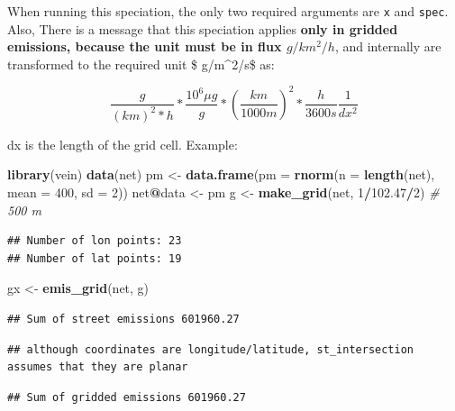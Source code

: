 \documentclass[12pt,graybox,envcountchap,sectrefs]{krantz}
\makeatletter
\newenvironment{Shaded}{\begin{snugshade}}{\end{snugshade}}
\newcommand{\KeywordTok}[1]{\textcolor[rgb]{0.13,0.29,0.53}{\textbf{#1}}}
\newcommand{\DataTypeTok}[1]{\textcolor[rgb]{0.13,0.29,0.53}{#1}}
\newcommand{\DecValTok}[1]{\textcolor[rgb]{0.00,0.00,0.81}{#1}}
\newcommand{\FloatTok}[1]{\textcolor[rgb]{0.00,0.00,0.81}{#1}}
\newcommand{\StringTok}[1]{\textcolor[rgb]{0.31,0.60,0.02}{#1}}
\newcommand{\CommentTok}[1]{\textcolor[rgb]{0.56,0.35,0.01}{\textit{#1}}}
\newcommand{\OperatorTok}[1]{\textcolor[rgb]{0.81,0.36,0.00}{\textbf{#1}}}
\newcommand{\NormalTok}[1]{#1}
\newenvironment{kframe}{%
\medskip{}
\setlength{\fboxsep}{.8em}
 \def\at@end@of@kframe{}%
 \ifinner\ifhmode%
  \def\at@end@of@kframe{\end{minipage}}%
  \begin{minipage}{\columnwidth}%
 \fi\fi%
 \def\FrameCommand##1{\hskip\@totalleftmargin \hskip-\fboxsep
 \colorbox{shadecolor}{##1}\hskip-\fboxsep
     \hskip-\linewidth \hskip-\@totalleftmargin \hskip\columnwidth}%
 \MakeFramed {\advance\hsize-\width
   \@totalleftmargin\z@ \linewidth\hsize
   \@setminipage}}%
 {\par\unskip\endMakeFramed%
 \at@end@of@kframe}
\renewenvironment{Shaded}{\begin{kframe}}{\end{kframe}}
\theoremstyle{definition}
\theoremstyle{definition}
\theoremstyle{definition}
\theoremstyle{remark}
\makeatother
\begin{document}
When running this speciation, the only two required arguments are
\texttt{x} and \texttt{spec}. Also, There is a message that this
speciation applies \textbf{only in gridded emissions, because the unit
must be in flux \(g/km^2/h\)}, and internally are transformed to the
required unit \$ \mu g/m\^{}2/s\$ as:

\[ \frac{g}{(km)^2*h}*\frac{10^6 \mu g}{g}*(\frac{km}{1000m})^2*\frac{h}{3600s}\frac{1}{dx^2}\]

dx is the length of the grid cell. Example:

\begin{Shaded}
\begin{Highlighting}[]
\KeywordTok{library}\NormalTok{(vein)}
\KeywordTok{data}\NormalTok{(net)}
\NormalTok{pm <-}\StringTok{ }\KeywordTok{data.frame}\NormalTok{(}\DataTypeTok{pm =} \KeywordTok{rnorm}\NormalTok{(}\DataTypeTok{n =} \KeywordTok{length}\NormalTok{(net), }\DataTypeTok{mean =} \DecValTok{400}\NormalTok{, }\DataTypeTok{sd =} \DecValTok{2}\NormalTok{))}
\NormalTok{net}\OperatorTok{@}\NormalTok{data <-}\StringTok{ }\NormalTok{pm}
\NormalTok{g <-}\StringTok{ }\KeywordTok{make_grid}\NormalTok{(net, }\DecValTok{1}\OperatorTok{/}\FloatTok{102.47}\OperatorTok{/}\DecValTok{2}\NormalTok{) }\CommentTok{# 500 m}
\end{Highlighting}
\end{Shaded}

\begin{verbatim}
## Number of lon points: 23
## Number of lat points: 19
\end{verbatim}

\begin{Shaded}
\begin{Highlighting}[]
\NormalTok{gx <-}\StringTok{ }\KeywordTok{emis_grid}\NormalTok{(net, g)}
\end{Highlighting}
\end{Shaded}

\begin{verbatim}
## Sum of street emissions 601960.27
\end{verbatim}

\begin{verbatim}
## although coordinates are longitude/latitude, st_intersection assumes that they are planar
\end{verbatim}

\begin{verbatim}
## Sum of gridded emissions 601960.27
\end{verbatim}
\end{document}
